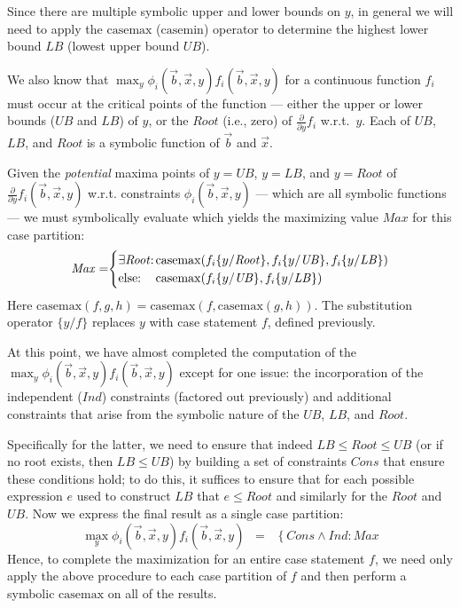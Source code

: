 \documentclass[twoside,11pt]{article}
\newcommand{\casemax}{\mathrm{casemax}}
\newcommand{\casemin}{\mathrm{casemin}}
\newcommand{\UB}{\mathit{UB}}
\newcommand{\LB}{\mathit{LB}}
\newcommand{\IND}{\mathit{Ind}}
\newcommand{\CONS}{\mathit{Cons}}
\newcommand{\Root}{\mathit{Root}}
\newcommand{\Max}{\mathit{Max}}
\newcommand{\sq}{\hspace{-1mm}}
\newcommand{\sqm}{\hspace{-2mm}}
\begin{document}
Since there are multiple symbolic upper and lower
bounds on $y$, in general we will need to apply the $\casemax$
($\casemin$) operator to determine the highest lower bound $\LB$
(lowest upper bound $\UB$).

We also know that $\max_y \phi_i(\vec{b},\vec{x},y)
f_i(\vec{b},\vec{x},y)$ for a continuous function $f_i$ must occur at the critical points of the function --- 
either the upper or lower bounds ($\UB$ and $\LB$) of $y$, 
or the $\Root$ (i.e., zero) of $\frac{\partial}{\partial y} f_i$ 
w.r.t.\ $y$.  Each of $\UB$, $\LB$, and $\Root$
is a symbolic function of $\vec{b}$ and $\vec{x}$. 

Given the \emph{potential} maxima points of $y = \UB$, $y = \LB$, and
$y = \Root$ of $\frac{\partial}{\partial y} f_i(\vec{b},\vec{x},y)$
w.r.t. constraints $\phi_i(\vec{b},\vec{x},y)$ --- which are all
symbolic functions --- we must symbolically evaluate which yields the
maximizing value $\Max$ for this case partition:
\vspace{2mm}
{%
\begin{align*}
\Max =  \sq \begin{cases}
\mbox{$\exists \Root$}  \sq: \sq & \sqm \casemax( f_i \{ y / \Root \}, f_i \{ y / \UB \}, f_i \{ y / \LB \})\\
\mbox{else}  \sq:  \sq & \sqm \casemax( f_i \{ y / \UB \}, f_i \{ y / \LB \})
\end{cases}
\end{align*}}
Here $\casemax(f,g,h) = \casemax(f,\casemax(g,h))$.  The 
substitution operator $\{ y / f \}$ replaces $y$ with case statement $f$, 
defined previously.

At this point, we have almost completed the computation
of the $\max_y \phi_i(\vec{b},\vec{x},y) f_i(\vec{b},\vec{x},y)$
except for one issue: the incorporation of the independent ($\IND$) constraints
(factored out previously) and additional constraints that arise from the
symbolic nature of the $\UB$, $\LB$, and $\Root$.  

Specifically for the latter, we need to ensure that indeed $\LB \leq \Root \leq \UB$
(or if no root exists, then $\LB \leq \UB$) by building a set
of constraints $\CONS$ that ensure these conditions hold; to do this,
it suffices to ensure that for each possible expression $e$ used to
construct $\LB$ that $e \leq \Root$ and similarly for the $Root$ and $\UB$.
Now we express the final result as a single case partition:
\begin{equation*}
\max_y \phi_i(\vec{b},\vec{x},y) f_i(\vec{b},\vec{x},y) \;\; = \;\;
\left\{ \CONS \land \IND: \Max \right.
\end{equation*}
Hence, to complete the maximization for an entire case statement $f$, we need only apply the above procedure to each case partition of $f$ and then perform a symbolic $\casemax$ on all of the results.  
\end{document}
